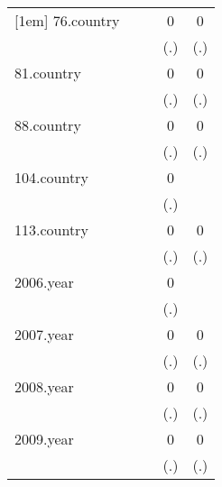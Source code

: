 {\begin{tabular}{l*{4}{c}}
[1em]
76.country  &                     &                     &           0         &           0         \\
            &                     &                     &         (.)         &         (.)         \\
[1em]
81.country  &                     &                     &           0         &           0         \\
            &                     &                     &         (.)         &         (.)         \\
[1em]
88.country  &                     &                     &           0         &           0         \\
            &                     &                     &         (.)         &         (.)         \\
[1em]
104.country &                     &                     &           0         &                     \\
            &                     &                     &         (.)         &                     \\
[1em]
113.country &                     &                     &           0         &           0         \\
            &                     &                     &         (.)         &         (.)         \\
[1em]
2006.year   &                     &                     &           0         &                     \\
            &                     &                     &         (.)         &                     \\
[1em]
2007.year   &                     &                     &           0         &           0         \\
            &                     &                     &         (.)         &         (.)         \\
[1em]
2008.year   &                     &                     &           0         &           0         \\
            &                     &                     &         (.)         &         (.)         \\
[1em]
2009.year   &                     &                     &           0         &           0         \\
            &                     &                     &         (.)         &         (.)         \\

\end{tabular}}
